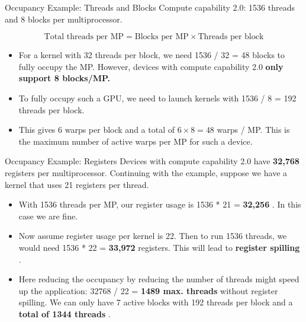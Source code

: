 \documentclass[9pt]{beamer}
\newcommand{\emphasize}[1]{\textbf{\color{red} #1 } }
\begin{document}

\begin{frame}[t]{Occupancy Example: Threads and Blocks}
Compute capability 2.0: 1536 threads and 8 blocks per multiprocessor.

\[ \text{Total threads per MP} = \text{Blocks per MP} \times \text{Threads per block} 
\]
\begin{itemize}
	\item For a kernel with 32 threads per block, we need 1536 / 32 = 48 blocks to fully occupy the MP. However, devices with compute capability 2.0 \emphasize{only support 8 blocks/MP.}
    
    \pause 
    \medskip
    
    \item To fully occupy such a GPU, we need to launch kernels with 1536 / 8 = 192  threads per block. 
    
    \pause 
    \medskip
    
    \item This gives 6 warps per block and a total of $ 6 \times 8 = 48 $ warps / MP. This is the maximum number of active warps per MP for such a device.
    
\end{itemize}
\end{frame}


\begin{frame}{Occupancy Example: Registers}
Devices with compute capability 2.0 have \emphasize{32,768} registers per multiprocessor. Continuing with the example, suppose we have a kernel that uses 21 registers per thread. 

\pause

\begin {itemize}
	\medskip
	\item With 1536 threads per MP, our register usage is 1536 * 21 = \emphasize{32,256}. In this case we are fine.  
    
    \pause 
    \medskip
    
    \item Now assume register usage per kernel is 22. Then to run 1536 threads, we would need 1536 * 22 = \emphasize{33,972} registers. This will lead to \emphasize{register spilling}. 
    
    \pause
    \medskip
    \item Here reducing the occupancy by reducing the number of threads might speed up the application: 32768 / 22 = \emphasize{1489 max. threads} without register spilling. We can only have 7 active blocks with 192 threads per block and a \emphasize{total of 1344 threads}. 
    
\end{itemize}
\end{frame}
\end{document}
